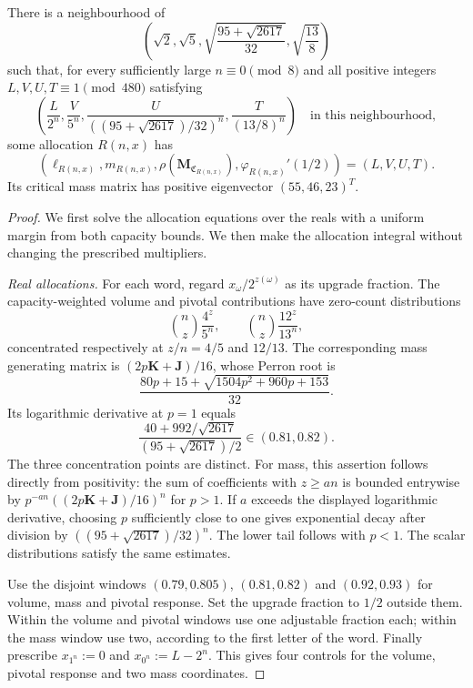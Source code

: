 \begin{lemma}\label{lem:wheatstone-open-realisation}
There is a neighbourhood of
\[
 \left(\sqrt2,\sqrt5,\sqrt{\frac{95+\sqrt{2617}}{32}},\sqrt{\frac{13}{8}}\right)
\]
such that, for every sufficiently large $n\equiv0\pmod8$ and all positive integers $L,V,U,T\equiv1\pmod{480}$ satisfying
\[
 \left(\frac{L}{2^n},\frac{V}{5^n},
 \frac{U}{((95+\sqrt{2617})/32)^n},\frac{T}{(13/8)^n}\right)
 \quad\text{in this neighbourhood},
\]
some allocation $R(n,x)$ has
\[
 (\ell_{R(n,x)},m_{R(n,x)},\rho(\mathbf M_{\mathfrak C_{R(n,x)}}),
 \varphi_{R(n,x)}'(1/2))=(L,V,U,T).
\]
Its critical mass matrix has positive eigenvector $(55,46,23)^T$.
\end{lemma}
\begin{proof}
We first solve the allocation equations over the reals with a uniform margin from both capacity bounds. We then make the allocation integral without changing the prescribed multipliers.

\emph{Real allocations.}
For each word, regard $x_\omega/2^{z(\omega)}$ as its upgrade fraction. The capacity-weighted volume and pivotal contributions have zero-count distributions
\[
 \binom nz\frac{4^z}{5^n},\qquad
 \binom nz\frac{12^z}{13^n},
\]
concentrated respectively at $z/n=4/5$ and $12/13$. The corresponding mass generating matrix is $(2p\mathbf K+\mathbf J)/16$, whose Perron root is
\[
 \frac{80p+15+\sqrt{1504p^2+960p+153}}{32}.
\]
Its logarithmic derivative at $p=1$ equals
\[
 \frac{40+992/\sqrt{2617}}{(95+\sqrt{2617})/2}\in(0.81,0.82).
\]
The three concentration points are distinct. For mass, this assertion follows directly from positivity: the sum of coefficients with $z\ge an$ is bounded entrywise by $p^{-an}((2p\mathbf K+\mathbf J)/16)^n$ for $p>1$. If $a$ exceeds the displayed logarithmic derivative, choosing $p$ sufficiently close to one gives exponential decay after division by $((95+\sqrt{2617})/32)^n$. The lower tail follows with $p<1$. The scalar distributions satisfy the same estimates.

Use the disjoint windows $(0.79,0.805)$, $(0.81,0.82)$ and $(0.92,0.93)$ for volume, mass and pivotal response. Set the upgrade fraction to $1/2$ outside them. Within the volume and pivotal windows use one adjustable fraction each; within the mass window use two, according to the first letter of the word. Finally prescribe $x_{1^n}:=0$ and $x_{0^n}:=L-2^n$. This gives four controls for the volume, pivotal response and two mass coordinates.


\end{proof}
